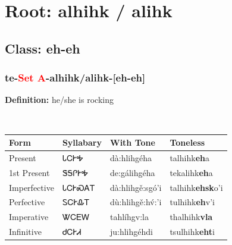 \needspace{4in}
\section*{Root: alhihk / alihk}
\nopagebreak
{}
\needspace{3in}
\subsection*{Class: eh-eh}
\nopagebreak
\needspace{2in}
\subsubsection*{te{-}\textcolor{Red}{Set A}{-}\textbf{alhihk/alihk}{-}[eh-eh]}
\nopagebreak
\textbf{Definition: } he/she is rocking
\\[0.5em]
\begin{tabularx}{\textwidth}{l X X X}%
\toprule%
\textbf{Form}&\textbf{Syllabary}&\textbf{With Tone}&\textbf{Toneless}\\%
\midrule%
Present&ᏓᏟᎨᎭ&dà:hlihgéha&talhihk\textbf{eh}a\\%
1st Present&ᏕᎦᎵᎨᎭ&de:gálihgéha&tekalihk\textbf{eh}a\\%
Imperfective&ᏓᏟᎨᏍᎪᎢ&dà:hlihgě:sgó’i&talhihk\textbf{ehsk}o'i\\%
Perfective&ᏚᏟᎨᎲᎢ&dù:hlihgě:hv́:’i&tulhihk\textbf{eh}v'i\\%
Imperative&ᏔᏟᎬᎳ&tahlíhgv:la&thalhihk\textbf{vla}\\%
Infinitive&ᏧᏟᎨᏗ&ju:hlihgéhdi&tsulhihk\textbf{eht}i\\%
\bottomrule%
\end{tabularx}
\\[1em]